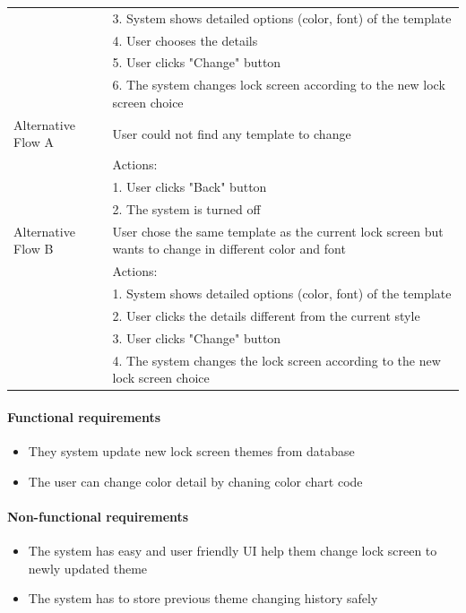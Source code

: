 \documentclass{article}
\begin{document}
\begin{table}[htbp]
\begin{tabularx}{\textwidth}{|>{\raggedright\arraybackslash}p{}|X|}
								 & 3. System shows detailed options (color, font) of the template \\
								 & 4. User chooses the details \\
								 & 5. User clicks "Change" button \\
								 & 6. The system changes lock screen according to the new lock screen choice \\ \hline
				Alternative Flow A & User could not find any template to change \\
								 & Actions: \\
								 & 1. User clicks "Back" button \\
								 & 2. The system is turned off \\ \hline
				Alternative Flow B & User chose the same template as the current lock screen but wants to change in different color and font \\
								 & Actions: \\
								 & 1. System shows detailed options (color, font) of the template \\
								 & 2. User clicks the details different from the current style \\
								 & 3. User clicks "Change" button \\
								 & 4. The system changes the lock screen according to the new lock screen choice \\ \hline
			\end{tabularx}
		\end{table}
		\paragraph{Functional requirements}
		\begin{itemize}
			\item They system update new lock screen themes from database
			\item The user can change color detail by chaning color chart code
		\end{itemize}
		
		\paragraph{Non-functional requirements}
		\begin{itemize}
			\item The system has easy and user friendly UI help them change lock screen to newly updated theme
			\item The system has to store previous theme changing history safely
		\end{itemize}
		\newpage
		
\end{document}
